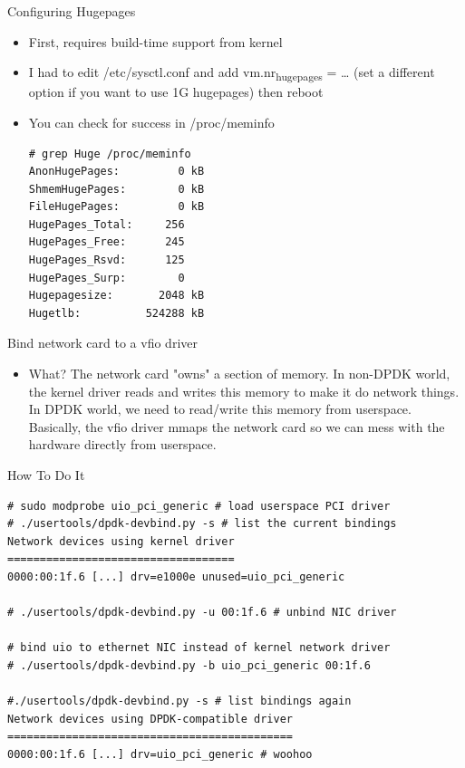 \documentclass[presentation]{beamer}
\begin{document}
\begin{frame}[label={sec:orge842218},fragile]{Configuring Hugepages}
 \begin{itemize}
\item First, requires build-time support from kernel
\item I had to edit /etc/sysctl.conf and add vm.nr\textsubscript{hugepages} = \ldots{} (set a different option if you want to use 1G hugepages) then reboot
\item You can check for success in /proc/meminfo
\begin{verbatim}
# grep Huge /proc/meminfo
AnonHugePages:         0 kB
ShmemHugePages:        0 kB
FileHugePages:         0 kB
HugePages_Total:     256
HugePages_Free:      245
HugePages_Rsvd:      125
HugePages_Surp:        0
Hugepagesize:       2048 kB
Hugetlb:          524288 kB
\end{verbatim}
\end{itemize}
\end{frame}

\begin{frame}[label={sec:org6eb6044}]{Bind network card to a vfio driver}
\begin{itemize}
\item What? The network card "owns" a section of memory. In non-DPDK
world, the kernel driver reads and writes this memory to make it
do network things. In DPDK world, we need to read/write this
memory from userspace. Basically, the vfio driver mmaps the
network card so we can mess with the hardware directly from
userspace.
\end{itemize}
\end{frame}

\begin{frame}[label={sec:org956b3a3},fragile]{How To Do It}
 \begin{verbatim}
# sudo modprobe uio_pci_generic # load userspace PCI driver
# ./usertools/dpdk-devbind.py -s # list the current bindings
Network devices using kernel driver
===================================
0000:00:1f.6 [...] drv=e1000e unused=uio_pci_generic

# ./usertools/dpdk-devbind.py -u 00:1f.6 # unbind NIC driver

# bind uio to ethernet NIC instead of kernel network driver
# ./usertools/dpdk-devbind.py -b uio_pci_generic 00:1f.6

#./usertools/dpdk-devbind.py -s # list bindings again
Network devices using DPDK-compatible driver
============================================
0000:00:1f.6 [...] drv=uio_pci_generic # woohoo
\end{verbatim}
\end{frame}
\end{document}
